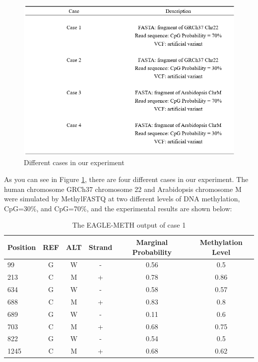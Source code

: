 \documentclass{PHlab-thesis}
\begin{document}
\begin{figure}[h]
  \centering
  \includegraphics[scale=0.8]{figures/Table3.PNG}
  \caption{Different cases in our experiment}
  \label{fig:cases} 
\end{figure}
\par As you can see in Figure \ref{fig:cases}, there are four different cases in our experiment. The human chromosome GRCh37 chromosome 22 and Arabidopsis chromosome M were simulated by MethylFASTQ at two different levels of DNA methylation, CpG=30\%, and CpG=70\%, and the experimental results are shown below:
\vspace{15mm}
\begin{table}[h!]
	\centering
	\begin{tabular}{l*{5}{c}}
		Position    & REF & ALT & Strand & Marginal Probability & Methylation Level\\
		\hline
		99  & G & W & - & 0.56 & 0.5  \\
		213 & C & M & + & 0.78 & 0.86  \\
		634 & G & W & - & 0.58 & 0.57  \\
		688 & C & M & + & 0.83 & 0.8  \\
		689 & G & W & - & 0.11 & 0.6  \\
    703 & C & M & + & 0.68 & 0.75  \\
		822 & G & W & - & 0.54 & 0.5  \\
    1245 & C & M & + & 0.68 & 0.62  \\
	\end{tabular}
	\caption{The EAGLE-METH output of case 1}
	\label{case_1}
\end{table}
\end{document}
